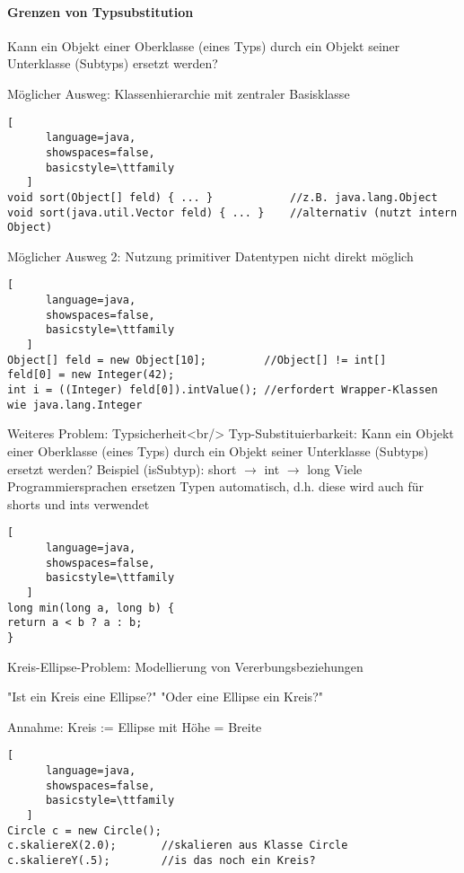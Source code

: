 \documentclass[10pt]{article}
\begin{document}
\paragraph{Grenzen von Typsubstitution}
Kann ein Objekt einer Oberklasse (eines Typs) durch ein Objekt seiner Unterklasse (Subtyps) ersetzt werden?

Möglicher Ausweg: Klassenhierarchie mit zentraler Basisklasse
\begin{lstlisting}[
      language=java,
      showspaces=false,
      basicstyle=\ttfamily
   ]
void sort(Object[] feld) { ... }            //z.B. java.lang.Object
void sort(java.util.Vector feld) { ... }    //alternativ (nutzt intern Object)
\end{lstlisting}

Möglicher Ausweg 2: Nutzung primitiver Datentypen nicht direkt möglich
\begin{lstlisting}[
      language=java,
      showspaces=false,
      basicstyle=\ttfamily
   ]
Object[] feld = new Object[10];         //Object[] != int[]
feld[0] = new Integer(42);
int i = ((Integer) feld[0]).intValue(); //erfordert Wrapper-Klassen wie java.lang.Integer
\end{lstlisting}


Weiteres Problem: Typsicherheit<br/>
Typ-Substituierbarkeit: Kann ein Objekt einer Oberklasse (eines Typs) durch ein Objekt seiner Unterklasse (Subtyps) ersetzt werden?
Beispiel (isSubtyp): short $\rightarrow$ int $\rightarrow$ long 
Viele Programmiersprachen ersetzen Typen automatisch, d.h. diese wird auch für shorts und ints verwendet
\begin{lstlisting}[
      language=java,
      showspaces=false,
      basicstyle=\ttfamily
   ]
long min(long a, long b) {
return a < b ? a : b;
}
\end{lstlisting}


Kreis-Ellipse-Problem: Modellierung von Vererbungsbeziehungen
\begin{itemize*}
  \item "Ist ein Kreis eine Ellipse?" "Oder eine Ellipse ein Kreis?"
  \item Annahme: Kreis := Ellipse mit Höhe = Breite
\end{itemize*}
\begin{lstlisting}[
      language=java,
      showspaces=false,
      basicstyle=\ttfamily
   ]
Circle c = new Circle();  
c.skaliereX(2.0);       //skalieren aus Klasse Circle
c.skaliereY(.5);        //is das noch ein Kreis?
\end{lstlisting}
\end{document}
